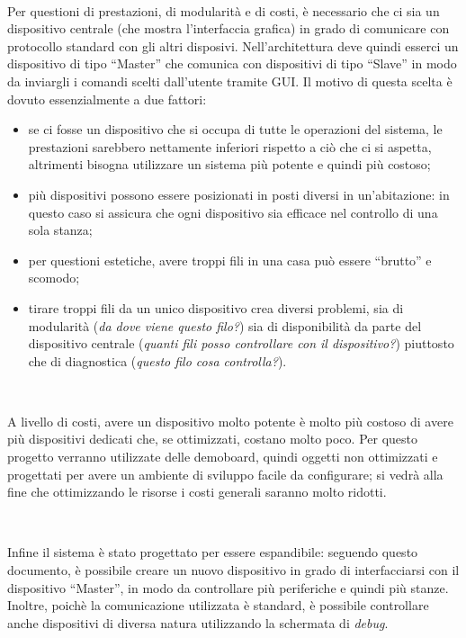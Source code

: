 \documentclass[a4paper,titlepage]{book}
\begin{document}
~

Per questioni di prestazioni, di modularità e di costi, è necessario che ci sia un dispositivo centrale (che mostra l'interfaccia grafica) in grado di comunicare con protocollo standard con gli altri disposivi. Nell'architettura deve quindi esserci un dispositivo di tipo ``Master'' che comunica con dispositivi di tipo ``Slave'' in modo da inviargli i comandi scelti dall'utente tramite GUI. Il motivo di questa scelta è dovuto essenzialmente a due fattori:

\begin{itemize}[noitemsep,topsep=10pt,parsep=23pt,partopsep=0pt]
\item se ci fosse un dispositivo che si occupa di tutte le operazioni del sistema, le prestazioni sarebbero nettamente inferiori rispetto a ciò che ci si aspetta, altrimenti bisogna utilizzare un sistema più potente e quindi più costoso;

\item più dispositivi possono essere posizionati in posti diversi in un'abitazione: in questo caso si assicura che ogni dispositivo sia efficace nel controllo di una sola stanza;

\item per questioni estetiche, avere troppi fili in una casa può essere ``brutto'' e scomodo;

\item tirare troppi fili da un unico dispositivo crea diversi problemi, sia di modularità (\textit{da dove viene questo filo?}) sia di disponibilità da parte del dispositivo centrale (\textit{quanti fili posso controllare con il dispositivo?}) piuttosto che di diagnostica (\textit{questo filo cosa controlla?}).


\end{itemize}

~

A livello di costi, avere un dispositivo molto potente è molto più costoso di avere più dispositivi dedicati che, se ottimizzati, costano molto poco.
Per questo progetto verranno utilizzate delle demoboard, quindi oggetti non ottimizzati e progettati per avere un ambiente di sviluppo facile da configurare; si vedrà alla fine che ottimizzando le risorse i costi generali saranno molto ridotti.

~

Infine il sistema è stato progettato per essere espandibile: seguendo questo documento, è possibile creare un nuovo dispositivo in grado di interfacciarsi con il dispositivo ``Master'', in modo da controllare più periferiche e quindi più stanze. Inoltre, poichè la comunicazione utilizzata è standard, è possibile controllare anche dispositivi di diversa natura utilizzando la schermata di \textit{debug}.
\end{document}
